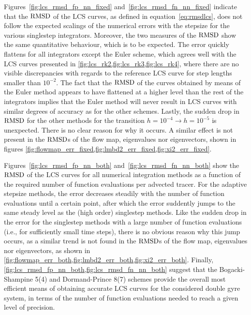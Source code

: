 Figures~\ref{fig:lcs_rmsd_fp_nn_fixed} and~\ref{fig:lcs_rmsd_fn_nn_fixed} indicate
that the $\operatorname{RMSD}$ of the LCS curves, as defined in equation~\eqref{eq:rmsdlcs},
does not follow the expected scalings of the numerical errors with the
stepsize for the various singlestep integrators. Moreover, the two measures of
the $\operatorname{RMSD}$ show the same quantitative behaviour, which is to be expected. The
error quickly flattens for all integrators except the Euler scheme, which agrees
well with the LCS curves presented in
\cref{fig:lcs_rk2,fig:lcs_rk3,fig:lcs_rk4}, where there are no visible
discrepancies with regards to the reference LCS curve for step lengths smaller
than $10^{-2}$. The fact that the $\operatorname{RMSD}$ of the curves obtained
by means of the Euler method appears to have flattened at a higher level than
the rest of the integrators implies that the Euler method will never result in
LCS curves with similar degrees of accuracy as for the other schemes. Lastly,
the sudden drop in $\operatorname{RMSD}$ for the other methods for the transition
$h=10^{-4}\rightarrow{h=10^{-5}}$ is unexpected. There is no clear reason for
why it occurs. A similar effect is not present in the $\operatorname{RMSD}$s of the
flow map, eigenvalues nor eigenvectors, shown in figures
\cref{fig:flowmap_err_fixed,fig:lmbd2_err_fixed,fig:xi2_err_fixed}.



Figures~\ref{fig:lcs_rmsd_fp_nn_both} and~\ref{fig:lcs_rmsd_fn_nn_both}
show the $\operatorname{RMSD}$ of the LCS curves for all numerical integration methods as a
function of the required number of function evaluations per advected tracer.
For the adaptive stepsize methods, the error decreases steadily
with the number of function evaluations until a certain point, after which
the error suddently jumps to the same steady level as the (high order)
singlestep methods. Like the sudden drop in the error for the singlestep
methods with a large number of function evaluations (i.e., for sufficiently
small time steps), there is no obvious reason why this jump occurs, as a similar
trend is not found in the $\operatorname{RMSD}$s of the flow map, eigenvalues nor eigenvectors,
as shown in
\cref{fig:flowmap_err_both,fig:lmbd2_err_both,fig:xi2_err_both}. Finally,
\cref{fig:lcs_rmsd_fp_nn_both,fig:lcs_rmsd_fn_nn_both} suggest that the
Bogacki-Shampine 5(4) and Dormand-Prince 8(7) schemes provide the overall most
efficient means of obtaining accurate LCS curves for the considered double gyre
system, in terms of the number of function evaluations needed to reach a given
level of precision.

